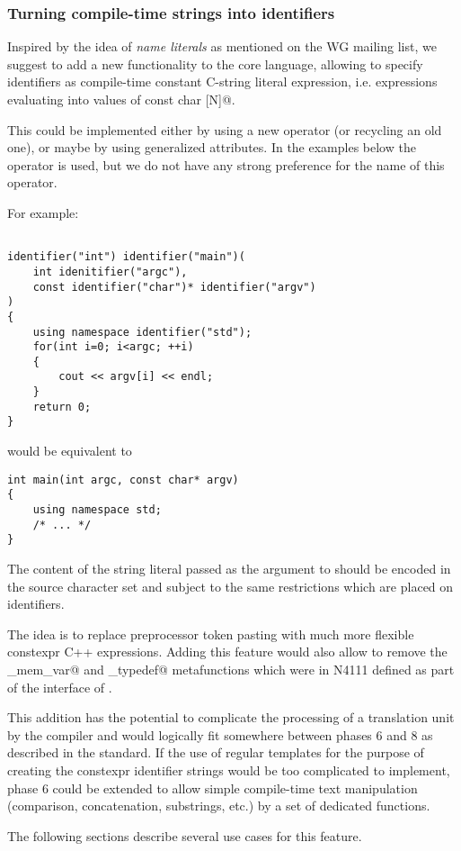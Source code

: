 \subsubsection{Turning compile-time strings into identifiers}

Inspired by the idea of {\em name literals} as mentioned on the WG mailing list,
we suggest to add a new functionality to the core language, allowing to specify
identifiers as compile-time constant C-string literal expression, i.e. expressions
evaluating into values of \verb@constexpr const char [N]@.

This could be implemented either by using a new operator (or recycling an old one),
or maybe by using generalized attributes.
In the examples below the \verb@identifier@ operator is used, but we do not have
any strong preference for the name of this operator.

For example:

\begin{verbatim}

identifier("int") identifier("main")(
	int idenitifier("argc"),
	const identifier("char")* identifier("argv")
)
{
	using namespace identifier("std");
	for(int i=0; i<argc; ++i)
	{
		cout << argv[i] << endl;
	}
	return 0;
}

\end{verbatim}

would be equivalent to

\begin{verbatim}
int main(int argc, const char* argv)
{
	using namespace std;
	/* ... */
}
\end{verbatim}

The content of the string literal passed as the argument to \verb@identifier@
should be encoded in the source character set and subject to the same restrictions
which are placed on identifiers.

The idea is to replace preprocessor token pasting with much more flexible constexpr C++ expressions.
Adding this feature would also allow to remove the \verb@named_mem_var@ and
\verb@named_typedef@ metafunctions which were in N4111 defined as part of
the interface of .

This addition has the potential to complicate the processing of a translation unit
by the compiler and would logically fit somewhere between phases 6 and 8 as described
in the standard. If the use of regular templates for the purpose of creating the
constexpr identifier strings would be too complicated to implement, phase 6 could
be extended to allow simple compile-time text manipulation (comparison, concatenation,
substrings, etc.) by a set of dedicated functions.

The following sections describe several use cases for this feature.

